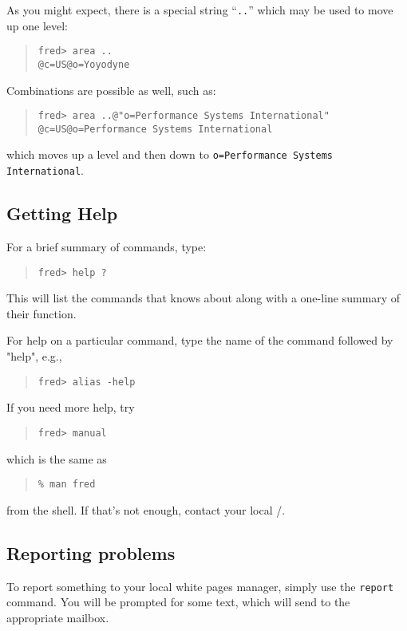As you might expect,
there is a special string ``\verb".."'' which may be used to move up one level:
\begin{quote}\small\begin{verbatim}
fred> area ..
@c=US@o=Yoyodyne
\end{verbatim}\end{quote}
Combinations are possible as well,
such as:
\begin{quote}\small\begin{verbatim}
fred> area ..@"o=Performance Systems International"
@c=US@o=Performance Systems International
\end{verbatim}\end{quote}
which moves up a level and then down to
\verb"o=Performance Systems International".

\subsection	{Getting Help}
For a brief summary of  commands,
type:
\begin{quote}\small\begin{verbatim}
fred> help ?
\end{verbatim}\end{quote}
This will list the commands that  knows about
along with a one-line summary of their function.

For help on a particular command,
type the name of the command followed by \switch"help",
e.g.,
\begin{quote}\small\begin{verbatim}
fred> alias -help
\end{verbatim}\end{quote}

If you need more help,
try
\begin{quote}\small\begin{verbatim}
fred> manual
\end{verbatim}\end{quote}
which is the same as
\begin{quote}\small\begin{verbatim}
% man fred
\end{verbatim}\end{quote}
from the shell.
If that's not enough,
contact your local \camayoc/.

\subsection	{Reporting problems}
To report something to your local white pages manager,
simply use the \verb"report" command.
You will be prompted for some text,
which  will send to the appropriate mailbox.

